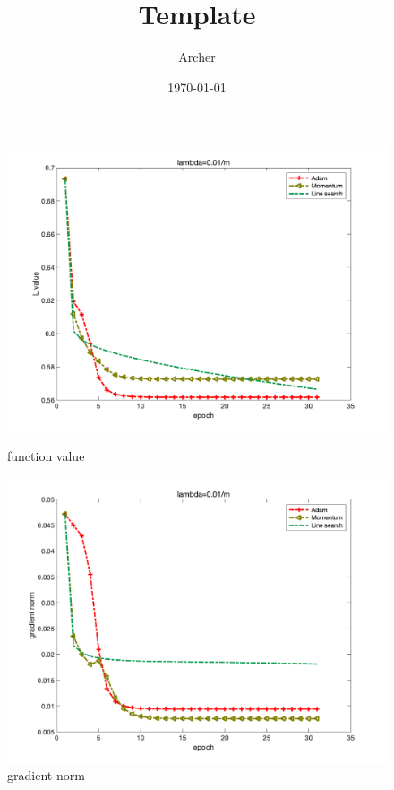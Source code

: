 \documentclass{article}
\title{Template}
\date{\today}
\author{Archer}
\begin{document}
\maketitle
\begin{figure}[H]
	\begin{minipage}{0.33\linewidth}
		\centering
		\includegraphics[width=1\linewidth]{./fig/fval_c4}
		\caption{function value}
	\end{minipage}
	\begin{minipage}{0.33\linewidth}
		\centering
		\includegraphics[width=1\linewidth]{./fig/gnorm_c4}
		\caption{gradient norm}
	\end{minipage}
	\begin{minipage}{0.33\linewidth}

\end{minipage}
\end{figure}
\end{document}
